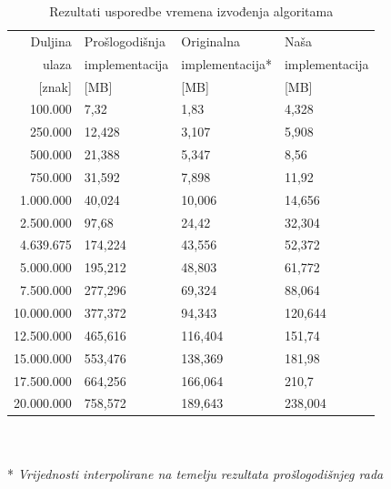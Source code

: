 \documentclass[a4paper,12pt]{article}
\begin{document}
\begin{table}[h!]
	\caption{Rezultati usporedbe vremena izvođenja algoritama}
	\label{tableMemComp}
	\begin{center}
		\begin{tabular}{rlll}
			\toprule
			Duljina & Prošlogodišnja & Originalna & Naša \\
			ulaza & implementacija & implementacija* & implementacija \\
			{[znak]} & [MB] & [MB] & [MB] \\
			\midrule
			100.000     &   7,32    &   1,83    &   4,328   \\
			250.000     &   12,428  &   3,107   &   5,908   \\
			500.000     &   21,388  &   5,347   &   8,56    \\
			750.000     &   31,592  &   7,898   &   11,92   \\
			1.000.000   &   40,024  &   10,006  &   14,656  \\
			2.500.000   &   97,68   &   24,42   &   32,304  \\
			4.639.675   &   174,224 &   43,556  &   52,372  \\
			5.000.000   &   195,212 &   48,803  &   61,772  \\
			7.500.000   &   277,296 &   69,324  &   88,064  \\
			10.000.000  &   377,372 &   94,343  &   120,644 \\
			12.500.000  &   465,616 &   116,404 &   151,74  \\
			15.000.000  &   553,476 &   138,369 &   181,98  \\
			17.500.000  &   664,256 &   166,064 &   210,7   \\
			20.000.000  &   758,572 &   189,643 &   238,004 \\
			\bottomrule
		\end{tabular}\\ ~ \\
		* \textit{Vrijednosti interpolirane na temelju rezultata prošlogodišnjeg rada}
	\end{center}
\end{table}
\end{document}
